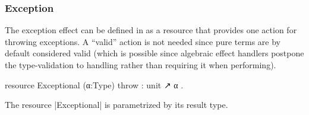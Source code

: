 %
%
%
%
%
%
%
%
% 
%

%
%
%
%

\subsubsection{Exception}
%
The exception effect can be defined in \LangD as a resource that provides one action for throwing exceptions.
A ``valid'' action is not needed since pure terms are by default considered valid (which is possible since algebraic effect handlers postpone the type-validation to handling rather than requiring it when performing).
%
\begin{program}[caption={Resource for exception}]
resource Exceptional (α:Type) { throw : unit ↗ α }.
\end{program}
%
The resource \code|Exceptional| is parametrized by its result type.

